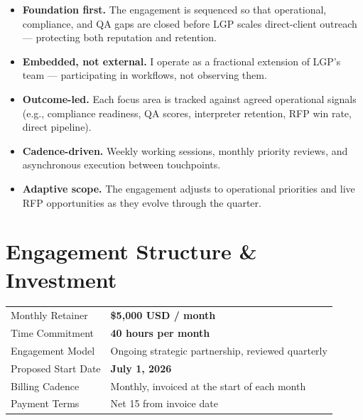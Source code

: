\documentclass{proposal}
\begin{document}
\begin{itemize}[leftmargin=1.5em, itemsep=4pt, topsep=4pt]
  \item \textbf{Foundation first.} The engagement is sequenced so that
        operational, compliance, and QA gaps are closed before LGP scales
        direct-client outreach --- protecting both reputation and
        retention.
  \item \textbf{Embedded, not external.} I operate as a fractional
        extension of LGP's team --- participating in workflows, not
        observing them.
  \item \textbf{Outcome-led.} Each focus area is tracked against agreed
        operational signals (e.g., compliance readiness, QA scores,
        interpreter retention, RFP win rate, direct pipeline).
  \item \textbf{Cadence-driven.} Weekly working sessions, monthly
        priority reviews, and asynchronous execution between touchpoints.
  \item \textbf{Adaptive scope.} The engagement adjusts to operational
        priorities and live RFP opportunities as they evolve through the
        quarter.
\end{itemize}

\section{Engagement Structure \& Investment}

\renewcommand{\arraystretch}{1.35}
\begin{tabularx}{\linewidth}{@{}>{\raggedright\arraybackslash}p{4.6cm} X@{}}
\toprule
\textcolor{TPGray}{\sffamily\small Monthly Retainer} &
\sffamily\textbf{\$5{,}000 USD / month} \\
\textcolor{TPGray}{\sffamily\small Time Commitment} &
\sffamily \textbf{40 hours per month} \\
\textcolor{TPGray}{\sffamily\small Engagement Model} &
\sffamily Ongoing strategic partnership, reviewed quarterly \\
\textcolor{TPGray}{\sffamily\small Proposed Start Date} &
\sffamily \textbf{July 1, 2026} \\
\textcolor{TPGray}{\sffamily\small Billing Cadence} &
\sffamily Monthly, invoiced at the start of each month \\
\textcolor{TPGray}{\sffamily\small Payment Terms} &
\sffamily Net 15 from invoice date \\
\bottomrule
\end{tabularx}
\end{document}
